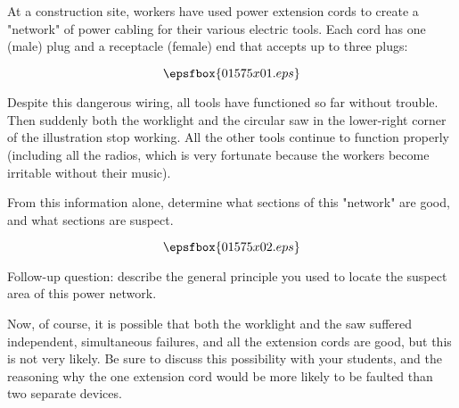 

At a construction site, workers have used power extension cords to create a "network" of power cabling for their various electric tools.  Each cord has one (male) plug and a receptacle (female) end that accepts up to three plugs:

$$\epsfbox{01575x01.eps}$$

Despite this dangerous wiring, all tools have functioned so far without trouble.  Then suddenly both the worklight and the circular saw in the lower-right corner of the illustration stop working.  All the other tools continue to function properly (including all the radios, which is very fortunate because the workers become irritable without their music).

From this information alone, determine what sections of this "network" are good, and what sections are suspect.







$$\epsfbox{01575x02.eps}$$

Follow-up question: describe the general principle you used to locate the suspect area of this power network.







Now, of course, it is possible that both the worklight and the saw suffered independent, simultaneous failures, and all the extension cords are good, but this is not very likely.  Be sure to discuss this possibility with your students, and the reasoning why the one extension cord would be more likely to be faulted than two separate devices.




